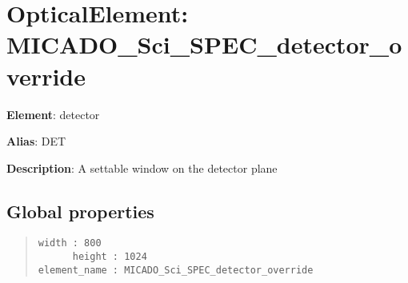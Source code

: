 

\section{OpticalElement: \textquotedbl{}MICADO\_Sci\_SPEC\_detector\_override\textquotedbl{}%
  \label{opticalelement-micado-sci-spec-detector-override}%
}

\textbf{Element}: detector

\textbf{Alias}: DET

\textbf{Description}: A settable window on the detector plane


\subsection{Global properties%
  \label{global-properties}%
}

\begin{quote}
\begin{alltt}
\begin{lstlisting}[frame=single]
       width : 800
      height : 1024
element_name : MICADO_Sci_SPEC_detector_override
\end{lstlisting}
\end{alltt}
\end{quote}
